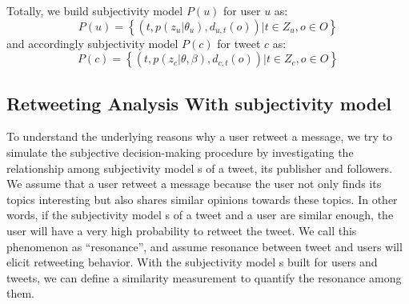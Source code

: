 \documentclass[smallcondensed]{svjour3}     %
\begin{document}
Totally, we build subjectivity model  $ P\left( u \right) $ for user $ u $ as:
\begin{equation}
\label{subuser}
P\left( u \right)= \left\lbrace \left( t, p\left( z_{u} \vert \theta_{u} \right), d_{u,t}\left( o \right) \right)  \vert t \in Z_{u}, o \in O  \right\rbrace  
\end{equation}
and accordingly subjectivity model  $ P\left( c \right) $ for tweet $ c $ as:
\begin{equation}
\label{subtweet}
P\left( c \right)= \left\lbrace \left( t, p\left( z_{c} \vert \theta, \beta \right), d_{c,t}\left( o \right) \right)  \vert t \in Z_{c}, o \in O  \right\rbrace  
\end{equation}

\subsection{Retweeting Analysis With subjectivity model }
\label{formulation}
To understand the underlying reasons why a user retweet a message, we try to simulate the subjective decision-making procedure by investigating the relationship among subjectivity model s of a tweet, its publisher and followers. 
We assume that a user retweet a message because the user not only finds its topics interesting but also shares similar opinions towards these topics. In other words, if the subjectivity model s of a tweet and a user are similar enough, the user will have a very high probability to retweet the tweet. 
We call this phenomenon as ``resonance'', and assume resonance between tweet and users will elicit retweeting behavior.
With the subjectivity model s built for users and tweets, we can define a similarity measurement to quantify the resonance among them.
\end{document}
